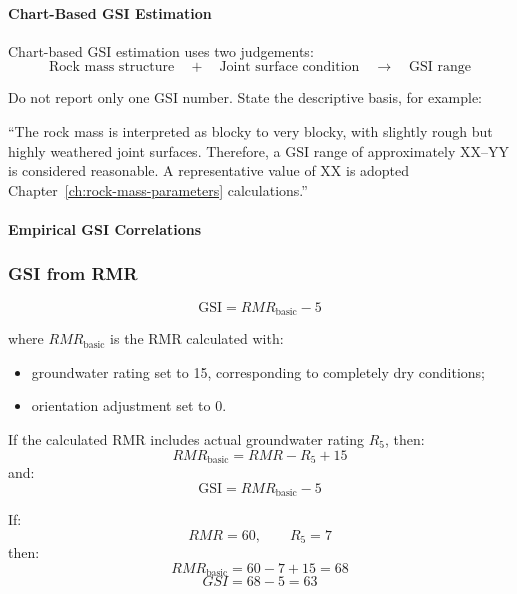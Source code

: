 \paragraph{Chart-Based GSI Estimation}

Chart-based GSI estimation uses two judgements:
\[
\text{Rock mass structure}
\quad + \quad
\text{Joint surface condition}
\quad \rightarrow \quad
\text{GSI range}
\]

\begin{notebox}
Do not report only one GSI number. State the descriptive basis, for example:

``The rock mass is interpreted as blocky to very blocky, with slightly rough but highly
weathered joint surfaces. Therefore, a GSI range of approximately XX--YY is considered
reasonable. A representative value of XX is adopted Chapter~\ref{ch:rock-mass-parameters} calculations.''
\end{notebox}

\paragraph{Empirical GSI Correlations}

\subsubsection{GSI from RMR}

\[
\boxed{\text{GSI}=RMR_{\text{basic}}-5}
\]

where \(RMR_{\text{basic}}\) is the RMR calculated with:
\begin{itemize}
 \item groundwater rating set to 15, corresponding to completely dry conditions;
 \item orientation adjustment set to 0.
\end{itemize}

If the calculated RMR includes actual groundwater rating \(R_5\), then:
\[
RMR_{\text{basic}} = RMR - R_5 + 15
\]
and:
\[
\text{GSI} = RMR_{\text{basic}} - 5
\]

\begin{calcbox}[Example]
If:
\[
RMR = 60,\qquad R_5=7
\]
then:
\[
RMR_{\text{basic}} = 60 - 7 + 15 = 68
\]
\[
GSI = 68 - 5 = 63
\]
\end{calcbox}

